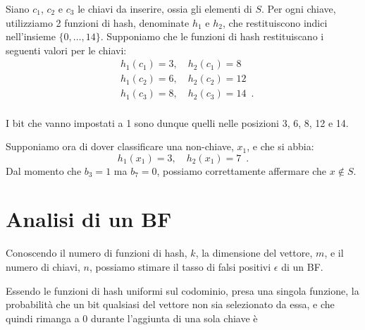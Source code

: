 Siano $c_1$, $c_2$ e $c_3$ le chiavi da inserire, ossia gli elementi di $S$. Per ogni chiave, utilizziamo 2 funzioni di hash, denominate $h_1$ e $h_2$, che restituiscono indici nell'insieme $\{0, \dots, 14 \}$. Supponiamo che le funzioni di hash restituiscano i seguenti valori per le chiavi:
\begin{equation}
    \begin{aligned}
        & h_1(c_1) = 3, \quad h_2(c_1) = 8 \\
        & h_1(c_2) = 6, \quad h_2(c_2) = 12 \\
        & h_1(c_3) = 8, \quad h_2(c_3) = 14 \enspace . \\
    \end{aligned}
\end{equation}

I bit che vanno impostati a 1 sono dunque quelli nelle posizioni 3, 6, 8, 12 e 14.

\begin{center}
\end{center}

Supponiamo ora di dover classificare una non-chiave, $x_1$, e che si abbia:
\begin{equation}
    h_1(x_1)=3, \quad h_2(x_1)=7 \enspace.
\end{equation}
Dal momento che $b_3 = 1$ ma $b_7 = 0$, possiamo correttamente affermare che $x \notin S$.


\section{Analisi di un BF}
\label{par:analisi-bf}

Conoscendo il numero di funzioni di hash, $k$, la dimensione del vettore, $m$, e il numero di chiavi, $n$, possiamo stimare il tasso di falsi positivi $\epsilon$ di un BF.

Essendo le funzioni di hash uniformi sul codominio, presa una singola funzione, la probabilità che un bit qualsiasi del vettore non sia selezionato da essa, e che quindi rimanga a 0 durante l'aggiunta di una sola chiave è

